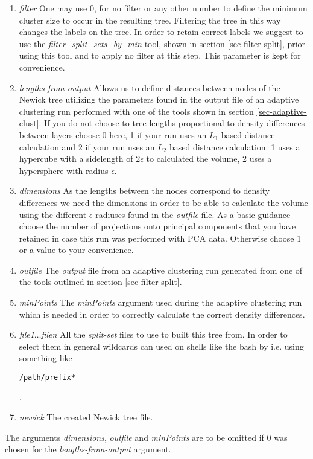 \begin{enumerate}
\item \emph{filter} One may use 0, for no filter or any other number
  to define the
    minimum cluster size to occur in the resulting tree. Filtering the
    tree in this way changes the labels on the tree. In order to retain correct
    labels we suggest to use the
    \emph{filter\_split\_sets\_by\_min} tool, shown in section
    \ref{sec-filter-split}, prior using this tool and to
    apply no filter at this step. This parameter is kept for convenience.
  \item \emph{lengths-from-output} Allows us to define
    distances between nodes of the
    Newick tree utilizing the parameters found in the output file of an
    adaptive clustering run performed with one of the tools shown in section
    \ref{sec-adaptive-clust}. If you do not choose to tree lengths
    proportional to density differences between layers choose 0 here,
    1 if your run uses an $L_1$ based distance calculation and 2 if your
    run uses an $L_2$ based distance calculation. 1 uses a hypercube
    with a sidelength of $2\epsilon$ to calculated the volume, 2 uses
    a hypersphere with radius $\epsilon$.
  \item \emph{dimensions} As the lengths between the nodes correspond
    to density differences we need the dimensions in order to be able
    to calculate the volume using the different $\epsilon$ radiuses found in the
    \emph{outfile} file. As a basic guidance choose the number of
    projections onto principal components that you have retained in
    case this run was performed with PCA data. Otherwise choose 1 or a value to
    your convenience.
  \item \emph{outfile} The \emph{output} file from an adaptive
    clustering run generated from one of the tools outlined in section
    \ref{sec-filter-split}.
  \item \emph{minPoints} The \emph{minPoints} argument used during the
    adaptive clustering run which is needed in order to correctly calculate the
    correct density differences.
  \item \emph{file1$\ldots$filen} All the \emph{split-set} files
    to use to built this tree from. In order to select them in general
    wildcards can used on shells like the bash by i.e. using something
    like \begin{verbatim}/path/prefix*\end{verbatim}.
  \item \emph{newick} The created Newick tree file. 
\end{enumerate}
The arguments \emph{dimensions}, \emph{outfile} and \emph{minPoints}
are to be omitted if 0 was chosen for the \emph{lengths-from-output}
argument.

